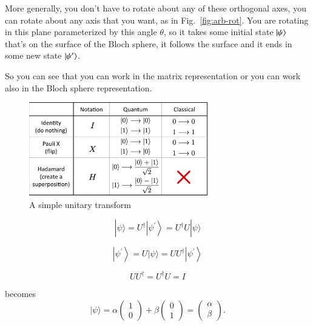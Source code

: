 More generally, you don't have to rotate about any of these orthogonal axes, you can rotate about any axis that you want, as in Fig.~\ref{fig:arb-rot}. You are rotating in this plane parameterized by this angle $\theta$, so it takes some initial state $\left| \psi \right\rangle$ that's on the surface of the Bloch sphere, it follows the surface and it ends in some new state $\left| \psi' \right\rangle$. 

So you can see that you can work in the matrix representation or you can work also in the Bloch sphere representation.

\begin{figure}[H]
    \centering
    \includegraphics[width=0.7\textwidth]{lesson2/simple_unitary_ops.pdf}
    
        \caption{A simple unitary transform}
    
    \label{fig: 1}
\end{figure}

\begin{equation}
|\psi\rangle=U^{\dagger}\left|\psi^{\prime}\right\rangle=U^{\dagger} U|\psi\rangle
\end{equation} 

\begin{equation}
\left|\psi^{\prime}\right\rangle=U|\psi\rangle=U U^{\dagger}\left|\psi^{\prime}\right\rangle
\end{equation}

\begin{equation}
U U^{\dagger}=U^{\dagger} U=I
\end{equation}

becomes
\begin{equation}
|\psi\rangle=\alpha\left(\begin{array}{l}
1 \\
0
\end{array}\right)+\beta\left(\begin{array}{l}
0 \\
1
\end{array}\right)=\left(\begin{array}{l}
\alpha \\
\beta
\end{array}\right).
\end{equation}

